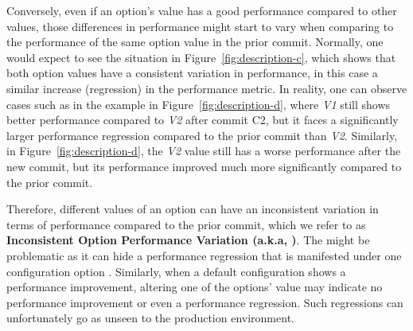 Conversely, even if an option's value has a good performance compared to other values, those differences in performance might start to vary %
when comparing to the performance of the same option value in the prior commit. Normally, one would expect to see the situation in Figure~\ref{fig:description-c}, which shows that both option values have a consistent variation in performance, in this case a similar increase (regression) in the performance metric. In reality, one can observe  cases such as in the example in Figure~\ref{fig:description-d}, where \emph{V1} still shows better performance compared to \emph{V2} after commit C2, but it faces a significantly larger performance regression compared to the prior commit than \emph{V2}. Similarly, in Figure~\ref{fig:description-d}, the \emph{V2} value still has a worse performance after the new commit, but its performance improved much more significantly compared to the prior commit.

Therefore, different values of an option can have an inconsistent variation in terms of performance compared to the prior commit, which %
we refer to as \textbf{Inconsistent Option Performance Variation (a.k.a, \inconsistent)}. The \inconsistent might be problematic as it can hide a performance regression that is manifested under one configuration option . Similarly, when a default configuration shows a performance improvement, altering one of the options' value may indicate no performance improvement or even a performance regression. Such regressions can unfortunately go as unseen to the production environment. 


